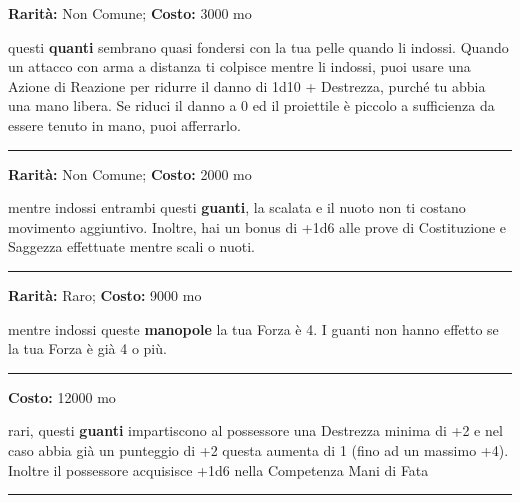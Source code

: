 \begin{multicols}{2}
\textbf{Rarità:} Non Comune; \textbf{Costo:} 3000 mo

questi \textbf{quanti} sembrano quasi fondersi con la tua pelle quando li indossi. Quando un attacco con arma a distanza ti colpisce mentre li indossi, puoi usare una Azione di Reazione per ridurre il danno di 1d10 + Destrezza, purché tu abbia una mano libera. Se riduci il danno a 0 ed il proiettile è piccolo a sufficienza da essere tenuto in mano, puoi afferrarlo.

\smallskip\noindent\rule{\linewidth}{2pt}  \hypertarget{GuantidelNuotoedellaScalata}{}\smallskip{}\noindent\label{GuantidelNuotoedellaScalata}

\textbf{Rarità:} Non Comune; \textbf{Costo:} 2000 mo

mentre indossi entrambi questi \textbf{guanti}, la scalata e il nuoto non ti costano movimento aggiuntivo. Inoltre, hai un bonus di +1d6 alle prove di Costituzione e Saggezza effettuate mentre scali o nuoti.

\smallskip\noindent\rule{\linewidth}{2pt}  \hypertarget{GuantidelPotereorchesco}{}\smallskip{}\noindent\label{GuantidelPotereorchesco}

\textbf{Rarità:} Raro; \textbf{Costo:} 9000 mo

mentre indossi queste \textbf{manopole} la tua Forza è 4. I guanti non hanno effetto se la tua Forza è già 4 o più.

\smallskip\noindent\rule{\linewidth}{2pt}  \hypertarget{GuantidellaDestrezza}{}\smallskip{}\noindent\label{GuantidellaDestrezza}

\textbf{Costo:} 12000 mo

rari, questi \textbf{guanti} impartiscono al possessore una Destrezza minima di +2 e nel caso abbia già un punteggio di +2 questa aumenta di 1 (fino ad un massimo +4). Inoltre il possessore acquisisce +1d6 nella Competenza Mani di Fata

\smallskip\noindent\rule{\linewidth}{2pt}  \hypertarget{GuantiMaldestri}{}\smallskip{}\noindent\label{GuantiMaldestri}


\end{multicols}
